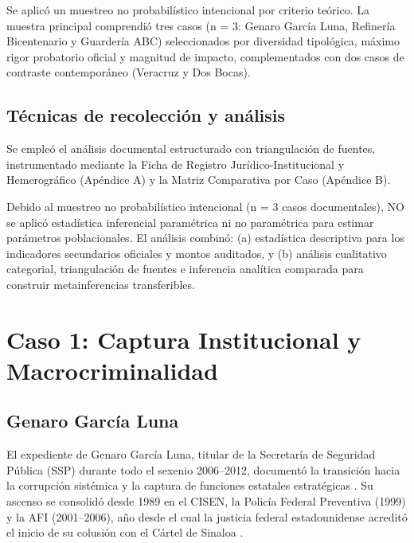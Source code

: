 \documentclass[12pt,letterpaper,oneside]{article}
\begin{document}
Se aplicó un muestreo no probabilístico intencional por criterio teórico. La muestra principal comprendió tres casos (n = 3: Genaro García Luna, Refinería Bicentenario y Guardería ABC) seleccionados por diversidad tipológica, máximo rigor probatorio oficial y magnitud de impacto, complementados con dos casos de contraste contemporáneo (Veracruz y Dos Bocas).

\subsection{Técnicas de recolección y análisis}

Se empleó el análisis documental estructurado con triangulación de fuentes, instrumentado mediante la Ficha de Registro Jurídico-Institucional y Hemerográfico (Apéndice A) y la Matriz Comparativa por Caso (Apéndice B).

Debido al muestreo no probabilístico intencional (n = 3 casos documentales), NO se aplicó estadística inferencial paramétrica ni no paramétrica para estimar parámetros poblacionales. El análisis combinó: (a) estadística descriptiva para los indicadores secundarios oficiales y montos auditados, y (b) análisis cualitativo categorial, triangulación de fuentes e inferencia analítica comparada para construir metainferencias transferibles.

\clearpage


\section{Caso 1: Captura Institucional y Macrocriminalidad}
\subsection{Genaro García Luna}

El expediente de Genaro García Luna, titular de la Secretaría de Seguridad Pública (SSP) durante todo el sexenio 2006--2012, documentó la transición hacia la corrupción sistémica y la captura de funciones estatales estratégicas \citep{astorga2015,flores2009,garay2012,merino2024,vazquezvalencia2019}. Su ascenso se consolidó desde 1989 en el CISEN, la Policía Federal Preventiva (1999) y la AFI (2001--2006), año desde el cual la justicia federal estadounidense acreditó el inicio de su colusión con el Cártel de Sinaloa \citep{castillog2023,pastrana2024}.
\end{document}
